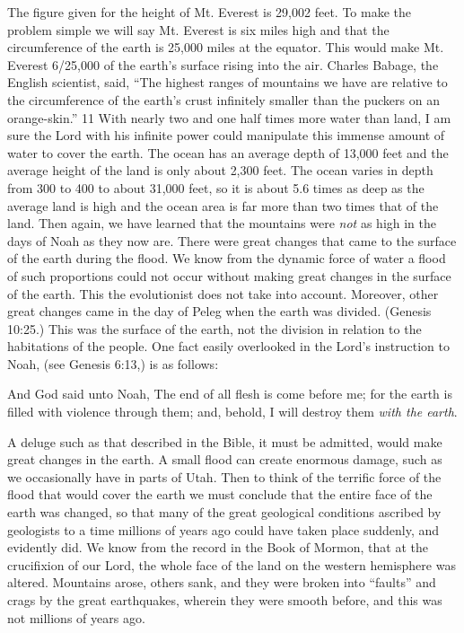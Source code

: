 The figure given for the height of Mt. Everest is 29,002 feet. To make the problem simple we
will say Mt. Everest is six miles high and that the circumference of the earth is 25,000 miles
at the equator. This would make Mt. Everest 6/25,000 of the earth's surface rising into the air.
Charles Babage, the English scientist, said, ``The highest ranges of mountains we have are
relative to the circumference of the earth's crust infinitely smaller than the puckers on an
orange-skin.'' 11 With nearly two and one half times more water than land, I am sure the
Lord with his infinite power could manipulate this immense amount of water to cover the
earth. The ocean has an average depth of 13,000 feet and the average height of the land is
only about 2,300 feet. The ocean varies in depth from 300 to 400 to about 31,000 feet, so it is
about 5.6 times as deep as the average land is high and the ocean area is far more than two
times that of the land. Then again, we have learned that the mountains were \textit{not} as high in the
days of Noah as they now are. There were great changes that came to the surface of the earth
during the flood. We know from the dynamic force of water a flood of such proportions
could not occur without making great changes in the surface of the earth. This the
evolutionist does not take into account. Moreover, other great changes came in the day of
Peleg when the earth was divided. (Genesis 10:25.) This was the surface of the earth, not the
division in relation to the habitations of the people. One fact easily overlooked in the Lord's
instruction to Noah, (see Genesis 6:13,) is as follows:

And God said unto Noah, The end of all flesh is come before me; for the earth is filled with
violence through them; and, behold, I will destroy them \textit{with the earth}.

A deluge such as that described in the Bible, it must be admitted, would make great changes
in the earth. A small flood can create enormous damage, such as we occasionally have in
parts of Utah. Then to think of the terrific force of the flood that would cover the earth we
must conclude that the entire face of the earth was changed, so that many of the great
geological conditions ascribed by geologists to a time millions of years ago could have taken
place suddenly, and evidently did. We know from the record in the Book of Mormon, that at
the crucifixion of our Lord, the whole face of the land on the western hemisphere was
altered. Mountains arose, others sank, and they were broken into ``faults'' and crags by the
great earthquakes, wherein they were smooth before, and this was not millions of years ago.

